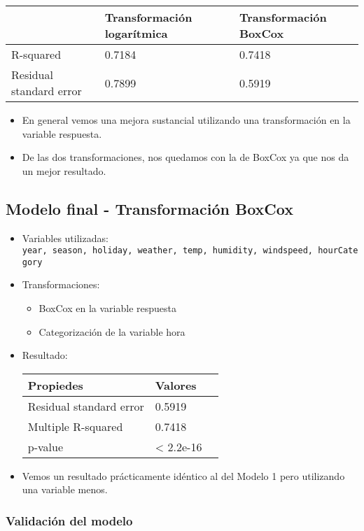 \documentclass[
]{article}
\providecommand{\tightlist}{%
  \setlength{\itemsep}{0pt}\setlength{\parskip}{0pt}}
\begin{document}
\begin{longtable}[]{@{}lll@{}}
\toprule
& Transformación logarítmica & Transformación BoxCox\tabularnewline
\midrule
\endhead
R-squared & 0.7184 & 0.7418\tabularnewline
Residual standard error & 0.7899 & 0.5919\tabularnewline
\bottomrule
\end{longtable}

\begin{itemize}
\tightlist
\item
  En general vemos una mejora sustancial utilizando una transformación
  en la variable respuesta.
\item
  De las dos transformaciones, nos quedamos con la de BoxCox ya que nos
  da un mejor resultado.
\end{itemize}

\hypertarget{modelo-final---transformaciuxf3n-boxcox}{%
\subsection{Modelo final - Transformación
BoxCox}\label{modelo-final---transformaciuxf3n-boxcox}}

\begin{itemize}
\item
  Variables utilizadas:
  \texttt{year,\ season,\ holiday,\ weather,\ temp,\ humidity,\ windspeed,\ hourCategory}
\item
  Transformaciones:

  \begin{itemize}
  \tightlist
  \item
    BoxCox en la variable respuesta
  \item
    Categorización de la variable hora
  \end{itemize}
\item
  Resultado:

  \begin{longtable}[]{@{}lll@{}}
  \toprule
  Propiedes & Valores &\tabularnewline
  \midrule
  \endhead
  Residual standard error & 0.5919 &\tabularnewline
  Multiple R-squared & 0.7418 &\tabularnewline
  p-value & \textless{} 2.2e-16 &\tabularnewline
  \bottomrule
  \end{longtable}
\item
  Vemos un resultado prácticamente idéntico al del Modelo 1 pero
  utilizando una variable menos.
\end{itemize}

\hypertarget{validaciuxf3n-del-modelo}{%
\subsubsection{Validación del modelo}\label{validaciuxf3n-del-modelo}}
\end{document}
